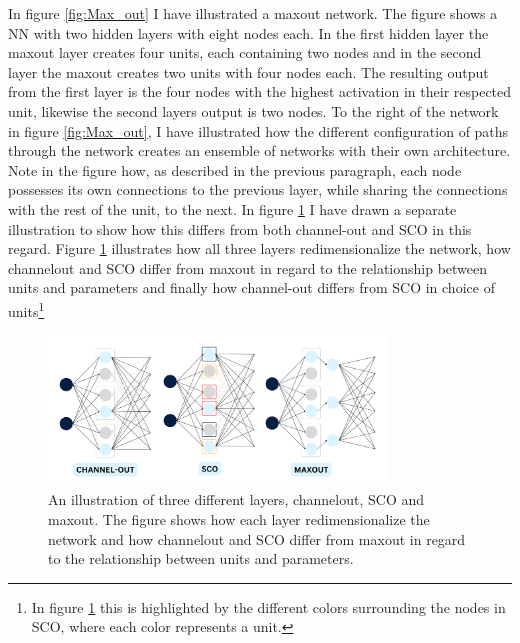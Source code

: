 In figure \ref{fig:Max_out} I have illustrated a maxout network. The figure shows a \ac{NN} with two hidden layers
with eight nodes each. In the first hidden layer the maxout layer creates four units, each containing two nodes and in the 
second layer the maxout creates two units with four nodes each. The resulting output from the first layer is the 
four nodes with the highest activation in their respected unit, likewise the second layers output is two nodes.
To the right of the network in figure \ref{fig:Max_out}, I have illustrated how the different configuration of 
paths through the network creates an ensemble of networks with their own architecture. Note in the figure how, as described in the 
previous paragraph, each node possesses its own connections to the previous layer, while sharing the connections with the 
rest of the unit, to the next. In figure \ref{fig:NetEnsembleComp} I have drawn a separate illustration to show how 
this differs from both channel-out and \ac{SCO} in this regard. Figure \ref{fig:NetEnsembleComp} illustrates how 
all three layers redimensionalize the network, how channelout and \ac{SCO} differ from maxout in regard to the relationship 
between units and parameters and finally how channel-out differs from \ac{SCO} in choice of units\footnote{In figure 
\ref{fig:NetEnsembleComp} this is highlighted by the different colors surrounding the nodes in \ac{SCO}, where each color 
represents a unit.}
\begin{figure}
    \centering
    \includegraphics[width=0.8\textwidth]{Figures/Illustrations/EnsembleComp.png}
    \caption[An illustration of three different layers, channelout, \acs{SCO} and maxout.]{An illustration of three different layers, channelout, \ac{SCO} and maxout. The figure shows how each layer 
    redimensionalize the network and how channelout and \ac{SCO} differ from maxout in regard to the relationship 
    between units and parameters.}
    \label{fig:NetEnsembleComp}
\end{figure}
